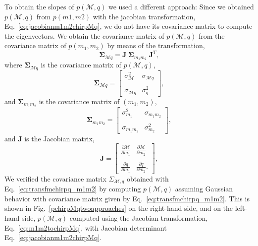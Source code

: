 \documentclass[a4paper,12pt]{article}
\begin{document}
To obtain the slopes of $p(\mathcal{M},q)$ we used a different approach: Since we obtained $p(\mathcal{M},q)$ from $p(m1,m2)$ with the jacobian transformation, Eq.~\eqref{eq:jacobianm1m2chirpMq}, we do not have its covariance matrix to compute the eigenvectors. We obtain the covariance matrix of $p(\mathcal{M},q)$ from the covariance matrix of $p(m_1,m_2)$ by means of the transformation,
\begin{equation}
\mathbf{\Sigma}_{\mathcal{M}q} = \mathbf{J} \; \mathbf{\Sigma}_{m_{1} m_{2}} \; \mathbf{J}^{T},
\label{eq:transfmchirpq_m1m2}
\end{equation}
where $\mathbf{\Sigma}_{\mathcal{M}q}$ is the covariance matrix of $p(\mathcal{M},q)$, 
\begin{equation}
\mathbf{\Sigma}_{\mathcal{M}q} = 
\begin{bmatrix}
     \sigma^{2}_\mathcal{M} &
     \sigma_{\mathcal{M}q} \\ \\
     \sigma_{\mathcal{M}q} & 
     \sigma^{2}_{q}     
\end{bmatrix},
\label{eq:covmchirpq}
\end{equation}
and $\mathbf{\Sigma}_{m_{1} m_{2}}$ is the covariance matrix of $(m_1,m_2)$,
\begin{equation}
\mathbf{\Sigma}_{m_1 m_2} = 
\begin{bmatrix}
     \sigma^{2}_{m_1} &
     \sigma_{m_{1} m_{2}} \\ \\
     \sigma_{m_{1} m_{2}} & 
     \sigma^{2}_{m_2}     
\end{bmatrix},
\label{covm1m2}
\end{equation}
and $\mathbf{J}$ is the Jacobian matrix,
\begin{equation}
\mathbf{J} =
\begin{bmatrix}
    \displaystyle
     \frac{\partial \mathcal{M}}{\partial m_{1}} &
     \displaystyle
     \frac{\partial \mathcal{M}}{\partial m_{2}} \\ \\
     \displaystyle
     \frac{\partial q}{\partial m_{1}} & 
     \displaystyle
     \frac{\partial q}{\partial m_{2}}.     
\end{bmatrix},
\label{jacobianmatrix}
\end{equation}
We verified the covariance matrix $\Sigma_{\mathcal{M},q}$ obtained with Eq.~\eqref{eq:transfmchirpq_m1m2} by computing $p(\mathcal{M},q)$ assuming Gaussian behavior with covariance matrix given by Eq.~\eqref{eq:transfmchirpq_m1m2}. This is shown in Fig.~\ref{pchirpMqtwoapproaches} on the right-hand side, and on the left-hand side, $p(\mathcal{M},q)$ computed using the Jacobian transformation, Eq.~\eqref{eq:m1m2tochirpMq}, with Jacobian determinant Eq.~\eqref{eq:jacobianm1m2chirpMq}.
\end{document}
